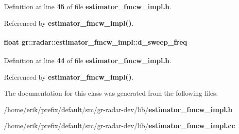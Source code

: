 Definition at line {\bf 45} of file {\bf estimator\+\_\+fmcw\+\_\+impl.\+h}.



Referenced by {\bf estimator\+\_\+fmcw\+\_\+impl()}.

\paragraph[{d\+\_\+sweep\+\_\+freq}]{\setlength{\rightskip}{0pt plus 5cm}float gr\+::radar\+::estimator\+\_\+fmcw\+\_\+impl\+::d\+\_\+sweep\+\_\+freq}\label{classgr_1_1radar_1_1estimator__fmcw__impl_aacbedec4243eb7e36dc653e23fc577d8}


Definition at line {\bf 44} of file {\bf estimator\+\_\+fmcw\+\_\+impl.\+h}.



Referenced by {\bf estimator\+\_\+fmcw\+\_\+impl()}.



The documentation for this class was generated from the following files\+:\begin{DoxyCompactItemize}
\item 
/home/erik/prefix/default/src/gr-\/radar-\/dev/lib/{\bf estimator\+\_\+fmcw\+\_\+impl.\+h}\item 
/home/erik/prefix/default/src/gr-\/radar-\/dev/lib/{\bf estimator\+\_\+fmcw\+\_\+impl.\+cc}\end{DoxyCompactItemize}
